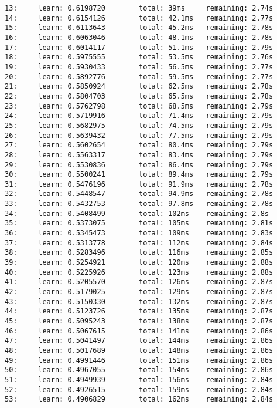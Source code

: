 \documentclass[11pt]{article}
\begin{document}
\begin{Verbatim}[commandchars=\\\{\}]
13:     learn: 0.6198720        total: 39ms     remaining: 2.74s
14:     learn: 0.6154126        total: 42.1ms   remaining: 2.77s
15:     learn: 0.6113643        total: 45.2ms   remaining: 2.78s
16:     learn: 0.6063046        total: 48.1ms   remaining: 2.78s
17:     learn: 0.6014117        total: 51.1ms   remaining: 2.79s
18:     learn: 0.5975555        total: 53.5ms   remaining: 2.76s
19:     learn: 0.5930433        total: 56.5ms   remaining: 2.77s
20:     learn: 0.5892776        total: 59.5ms   remaining: 2.77s
21:     learn: 0.5850924        total: 62.5ms   remaining: 2.78s
22:     learn: 0.5804703        total: 65.5ms   remaining: 2.78s
23:     learn: 0.5762798        total: 68.5ms   remaining: 2.79s
24:     learn: 0.5719916        total: 71.4ms   remaining: 2.79s
25:     learn: 0.5682975        total: 74.5ms   remaining: 2.79s
26:     learn: 0.5639432        total: 77.5ms   remaining: 2.79s
27:     learn: 0.5602654        total: 80.4ms   remaining: 2.79s
28:     learn: 0.5563317        total: 83.4ms   remaining: 2.79s
29:     learn: 0.5530836        total: 86.4ms   remaining: 2.79s
30:     learn: 0.5500241        total: 89.4ms   remaining: 2.79s
31:     learn: 0.5476196        total: 91.9ms   remaining: 2.78s
32:     learn: 0.5448547        total: 94.9ms   remaining: 2.78s
33:     learn: 0.5432753        total: 97.8ms   remaining: 2.78s
34:     learn: 0.5408499        total: 102ms    remaining: 2.8s
35:     learn: 0.5373075        total: 105ms    remaining: 2.81s
36:     learn: 0.5345473        total: 109ms    remaining: 2.83s
37:     learn: 0.5313778        total: 112ms    remaining: 2.84s
38:     learn: 0.5283496        total: 116ms    remaining: 2.85s
39:     learn: 0.5254921        total: 120ms    remaining: 2.88s
40:     learn: 0.5225926        total: 123ms    remaining: 2.88s
41:     learn: 0.5205570        total: 126ms    remaining: 2.87s
42:     learn: 0.5179025        total: 129ms    remaining: 2.87s
43:     learn: 0.5150330        total: 132ms    remaining: 2.87s
44:     learn: 0.5123726        total: 135ms    remaining: 2.87s
45:     learn: 0.5095243        total: 138ms    remaining: 2.87s
46:     learn: 0.5067615        total: 141ms    remaining: 2.86s
47:     learn: 0.5041497        total: 144ms    remaining: 2.86s
48:     learn: 0.5017689        total: 148ms    remaining: 2.86s
49:     learn: 0.4991446        total: 151ms    remaining: 2.86s
50:     learn: 0.4967055        total: 154ms    remaining: 2.86s
51:     learn: 0.4949939        total: 156ms    remaining: 2.84s
52:     learn: 0.4926515        total: 159ms    remaining: 2.84s
53:     learn: 0.4906829        total: 162ms    remaining: 2.84s

\end{Verbatim}
\end{document}
